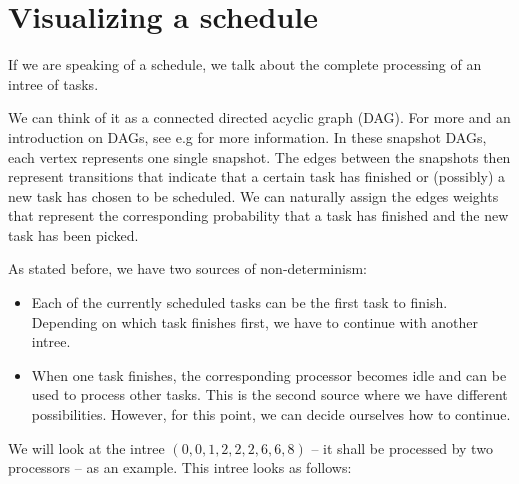 \section{Visualizing a schedule}
\label{sec:intro-visualizing-schedules}

If we are speaking of a schedule, we talk about the complete processing of an intree of tasks.

We can think of it as a connected directed acyclic graph (DAG). For more and an introduction on DAGs, see e.g \cite{diestel2005graph} for more information. In these snapshot DAGs, each vertex represents one single snapshot. The edges between the snapshots then represent transitions that indicate that a certain task has finished or (possibly) a new task has chosen to be scheduled. We can naturally assign the edges weights that represent the corresponding probability that a task has finished and the new task has been picked.

As stated before, we have two sources of non-determinism:
\begin{itemize}
\item Each of the currently scheduled tasks can be the first task to finish. Depending on which task finishes first, we have to continue with another intree.
\item When one task finishes, the corresponding processor becomes idle and can be used to process other tasks. This is the second source where we have different possibilities. However, for this point, we can decide ourselves how to continue.
\end{itemize}

We will look at the intree $(0,0,1,2,2,2,6,6,8)$ -- it shall be processed by two processors -- as an example. This intree looks as follows:

\begin{center}
\end{center}

